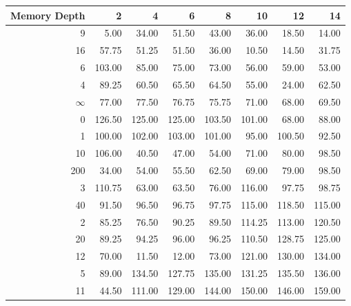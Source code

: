 \begin{tabular}{rrrrrrrr}
\toprule
 Memory Depth &       2 &       4 &       6 &       8 &      10 &      12 &      14 \\
\midrule
            9 &    5.00 &   34.00 &   51.50 &   43.00 &   36.00 &   18.50 &   14.00 \\
           16 &   57.75 &   51.25 &   51.50 &   36.00 &   10.50 &   14.50 &   31.75 \\
            6 &  103.00 &   85.00 &   75.00 &   73.00 &   56.00 &   59.00 &   53.00 \\
            4 &   89.25 &   60.50 &   65.50 &   64.50 &   55.00 &   24.00 &   62.50 \\
           $\infty$ &   77.00 &   77.50 &   76.75 &   75.75 &   71.00 &   68.00 &   69.50 \\
            0 &  126.50 &  125.00 &  125.00 &  103.50 &  101.00 &   68.00 &   88.00 \\
            1 &  100.00 &  102.00 &  103.00 &  101.00 &   95.00 &  100.50 &   92.50 \\
           10 &  106.00 &   40.50 &   47.00 &   54.00 &   71.00 &   80.00 &   98.50 \\
          200 &   34.00 &   54.00 &   55.50 &   62.50 &   69.00 &   79.00 &   98.50 \\
            3 &  110.75 &   63.00 &   63.50 &   76.00 &  116.00 &   97.75 &   98.75 \\
           40 &   91.50 &   96.50 &   96.75 &   97.75 &  115.00 &  118.50 &  115.00 \\
            2 &   85.25 &   76.50 &   90.25 &   89.50 &  114.25 &  113.00 &  120.50 \\
           20 &   89.25 &   94.25 &   96.00 &   96.25 &  110.50 &  128.75 &  125.00 \\
           12 &   70.00 &   11.50 &   12.00 &   73.00 &  121.00 &  130.00 &  134.00 \\
            5 &   89.00 &  134.50 &  127.75 &  135.00 &  131.25 &  135.50 &  136.00 \\
           11 &   44.50 &  111.00 &  129.00 &  144.00 &  150.00 &  146.00 &  159.00 \\
\bottomrule
\end{tabular}
